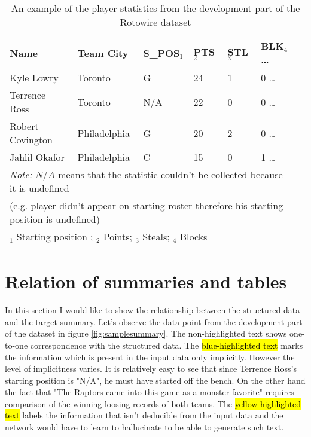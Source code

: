 \begin{table}[h!]
    \begin{tabular}{lllllll}
        \toprule
        Name             & Team City    & S\_POS$_1$ & PTS$_2$ & STL$_3$ & BLK$_4$        \dots \\
        \midrule
        Kyle Lowry       & Toronto      & G         & 24  & 1   & 0       \dots \\
        Terrence Ross    & Toronto      & N/A       & 22  & 0   & 0        \dots \\
        Robert Covington & Philadelphia & G         & 20  & 2   & 0        \dots \\
        Jahlil Okafor    & Philadelphia & C         & 15  & 0   & 1        \dots \\
        \bottomrule
        \multicolumn{6}{l}{\footnotesize \textit{Note:} $N/A$ means that the statistic couldn't be collected because it is undefined} \\
        \multicolumn{6}{l}{\footnotesize (e.g. player didn't appear on starting roster therefore his starting position is undefined)} \\
        \multicolumn{6}{l}{\footnotesize $_1$ Starting position ; $_2$ Points; $_3$ Steals; $_4$ Blocks}
    \end{tabular}
    \caption{\centering An example of the player statistics from the development part of the Rotowire dataset}\label{tab_player_stats}
\end{table}

\section{Relation of summaries and tables}

In this section I would like to show the relationship between the structured data and the target summary. Let's observe the data-point from the development part of the dataset in figure \ref{fig:samplesummary}. The non-highlighted text shows one-to-one correspondence with the structured data. The  \hl{blue-highlighted text} marks the information which is present in the input data only implicitly. However the level of implicitness varies. It is relatively easy to see that since Terrence Ross's starting position is "N/A", he must have started off the bench. On the other hand the fact that "The Raptors came into this game as a monster favorite" requires comparison of the winning-loosing records of both teams. The  \hl{yellow-highlighted text} labels the information that isn't deducible from the input data and the network would have to learn to hallucinate to be able to generate such text.

